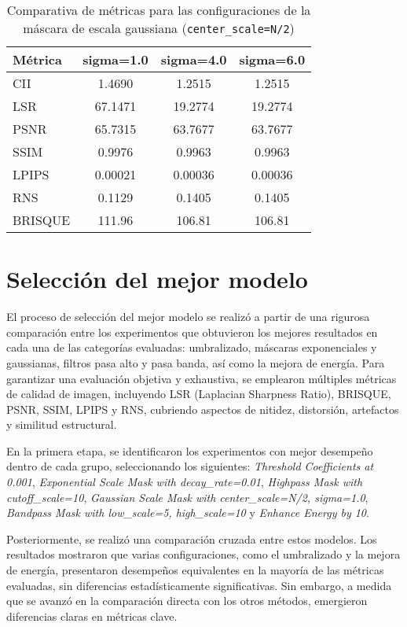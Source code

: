 \begin{table}[H]
    \centering
    \caption{Comparativa de métricas para las configuraciones de la máscara de escala gaussiana (\texttt{center\_scale=N/2})}
    \begin{tabular}{|l|c|c|c|}
    \hline
    \textbf{Métrica} & \textbf{sigma=1.0} & \textbf{sigma=4.0} & \textbf{sigma=6.0} \\
    \hline
    CII & 1.4690 & 1.2515 & 1.2515 \\
    LSR & 67.1471 & 19.2774 & 19.2774 \\
    PSNR & 65.7315 & 63.7677 & 63.7677 \\
    SSIM & 0.9976 & 0.9963 & 0.9963 \\
    LPIPS & 0.00021 & 0.00036 & 0.00036 \\
    RNS & 0.1129 & 0.1405 & 0.1405 \\
    BRISQUE & 111.96 & 106.81 & 106.81 \\
    \hline
    \end{tabular}
    \label{tab:gaussian_comparativa}
\end{table}

\section{Selección del mejor modelo}

El proceso de selección del mejor modelo se realizó a partir de una rigurosa comparación entre los experimentos que obtuvieron los mejores resultados en cada una de las categorías evaluadas: umbralizado, máscaras exponenciales y gaussianas, filtros pasa alto y pasa banda, así como la mejora de energía. Para garantizar una evaluación objetiva y exhaustiva, se emplearon múltiples métricas de calidad de imagen, incluyendo LSR (Laplacian Sharpness Ratio), BRISQUE, PSNR, SSIM, LPIPS y RNS, cubriendo aspectos de nitidez, distorsión, artefactos y similitud estructural.

En la primera etapa, se identificaron los experimentos con mejor desempeño dentro de cada grupo, seleccionando los siguientes: \textit{Threshold Coefficients at 0.001}, \textit{Exponential Scale Mask with decay\_rate=0.01}, \textit{Highpass Mask with cutoff\_scale=10}, \textit{Gaussian Scale Mask with center\_scale=N/2, sigma=1.0}, \textit{Bandpass Mask with low\_scale=5, high\_scale=10} y \textit{Enhance Energy by 10}.

Posteriormente, se realizó una comparación cruzada entre estos modelos. Los resultados mostraron que varias configuraciones, como el umbralizado y la mejora de energía, presentaron desempeños equivalentes en la mayoría de las métricas evaluadas, sin diferencias estadísticamente significativas. Sin embargo, a medida que se avanzó en la comparación directa con los otros métodos, emergieron diferencias claras en métricas clave.

